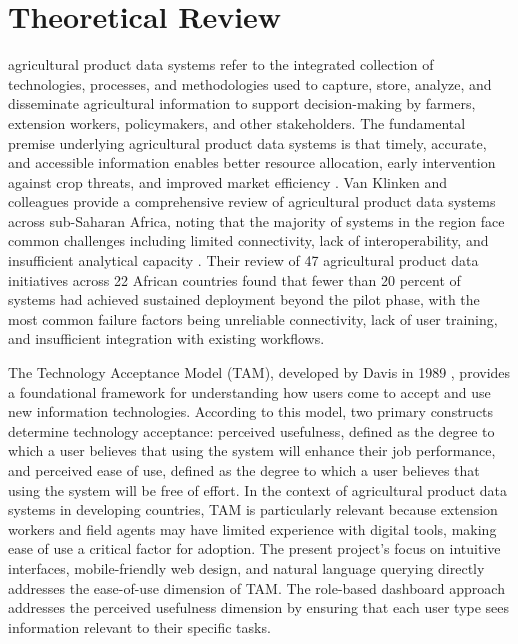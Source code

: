 \documentclass[12pt,a4paper,oneside]{report}
\begin{document}
\section{Theoretical Review}
agricultural product data systems refer to the integrated collection of technologies, processes, and methodologies used to capture, store, analyze, and disseminate agricultural information to support decision-making by farmers, extension workers, policymakers, and other stakeholders. The fundamental premise underlying agricultural product data systems is that timely, accurate, and accessible information enables better resource allocation, early intervention against crop threats, and improved market efficiency \cite{fao2023}. Van Klinken and colleagues provide a comprehensive review of agricultural product data systems across sub-Saharan Africa, noting that the majority of systems in the region face common challenges including limited connectivity, lack of interoperability, and insufficient analytical capacity \cite{vanklinken2022}. Their review of 47 agricultural product data initiatives across 22 African countries found that fewer than 20 percent of systems had achieved sustained deployment beyond the pilot phase, with the most common failure factors being unreliable connectivity, lack of user training, and insufficient integration with existing workflows.

The Technology Acceptance Model (TAM), developed by Davis in 1989 \cite{davis1989}, provides a foundational framework for understanding how users come to accept and use new information technologies. According to this model, two primary constructs determine technology acceptance: perceived usefulness, defined as the degree to which a user believes that using the system will enhance their job performance, and perceived ease of use, defined as the degree to which a user believes that using the system will be free of effort. In the context of agricultural product data systems in developing countries, TAM is particularly relevant because extension workers and field agents may have limited experience with digital tools, making ease of use a critical factor for adoption. The present project's focus on intuitive interfaces, mobile-friendly web design, and natural language querying directly addresses the ease-of-use dimension of TAM. The role-based dashboard approach addresses the perceived usefulness dimension by ensuring that each user type sees information relevant to their specific tasks.
\end{document}
